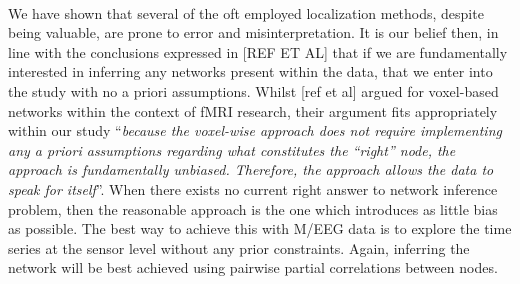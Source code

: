 \documentclass[11pt]{article}
\begin{document}
\\
We have shown that several of the oft employed localization methods, despite being valuable, are prone to error and misinterpretation. It is our belief then, in line with the conclusions expressed in [REF ET AL] that if we are fundamentally interested in inferring any networks present within the data, that we enter into the study with no a priori assumptions. Whilst [ref et al] argued for voxel-based networks within the context of fMRI research, their argument fits appropriately within our study ``\emph{because the voxel-wise approach does not require implementing any a priori assumptions regarding what constitutes the “right” node, the approach is fundamentally unbiased. Therefore, the approach allows the data to speak for itself}''. When there exists no current right answer to network inference problem, then the reasonable approach is the one which introduces as little bias as possible. The best way to achieve this with M/EEG data is to explore the time series at the sensor level without any prior constraints. Again, inferring the network will be best achieved using pairwise partial correlations between nodes.
\end{document}
